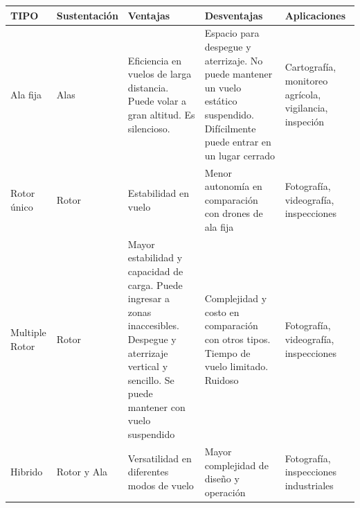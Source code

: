 \documentclass{article}
\begin{document}
\begin{table}
  
  \begin{center}
    \begin{tabular}{| l | l | p{5cm} | p{5cm} | p{5cm} |}
      \hline
      TIPO & Sustentación & Ventajas & Desventajas & Aplicaciones \\ \hline
      Ala fija & Alas & Eficiencia en vuelos de larga distancia. Puede volar a gran altitud. Es silencioso. & Espacio para despegue y aterrizaje. No puede mantener un vuelo estático suspendido. Difícilmente puede entrar en un lugar cerrado & Cartografía, monitoreo agrícola, vigilancia, inspeción \\ \hline
      Rotor único & Rotor & Estabilidad en vuelo & Menor autonomía en comparación con drones de ala fija & Fotografía, videografía, inspecciones \\ \hline
      Multiple Rotor & Rotor & Mayor estabilidad y capacidad de carga. Puede ingresar a zonas inaccesibles. Despegue y aterrizaje vertical y sencillo. Se puede mantener con vuelo suspendido & Complejidad y costo en comparación con otros tipos. Tiempo de vuelo limitado. Ruidoso & Fotografía, videografía, inspecciones \\ \hline
      Hibrido & Rotor y Ala & Versatilidad en diferentes modos de vuelo & Mayor complejidad de diseño y operación & Fotografía, inspecciones industriales \\
      \hline
    \end{tabular}
  \end{center}
  
\end{table}
\end{document}
